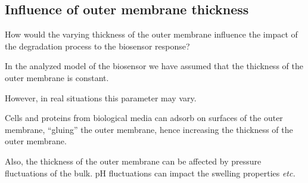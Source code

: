 \documentclass[hyperref={breaklinks=true},fleqn,mathserif]{beamer}
\begin{document}

\subsection{Influence of outer membrane thickness}

\begin{frame}{How would the varying thickness of the outer membrane influence the impact of the degradation process to the biosensor response?}

\begin{exampleblock}{}
In the analyzed model of the biosensor we have assumed that the thickness of the outer membrane is constant.
\end{exampleblock}

\pause
\begin{block}{}
However, in real situations this parameter may vary.

\smallskip
Cells and proteins from biological media can adsorb on surfaces of the outer membrane, ``gluing'' the outer membrane,
hence increasing the thickness of the outer membrane.

\smallskip
Also, the thickness of the outer membrane can be affected by pressure fluctuations of the bulk.
pH fluctuations can impact the swelling properties \textit{etc.}
\end{block}

\end{frame}
\end{document}
